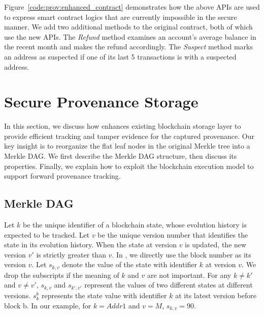 Figure~\ref{code:prov:enhanced_contract} demonstrates how the above APIs are used to express smart contract logics
that are currently impossible in the secure manner.
We add two additional methods to the original contract, both of which use the new
APIs. The \textit{Refund} method examines an account's average balance in the recent month and makes the
refund accordingly. The \textit{Suspect} method marks an address as suspected if one of its last 5
transactions is with a suspected address. 



\section{Secure Provenance Storage} 
\label{prov:sec:storage}
In this section, we discuss how {\fs} enhances existing blockchain storage layer to provide efficient
tracking and tamper evidence for the captured provenance. Our key insight is to reorganize the flat leaf
nodes in the original Merkle tree into a Merkle DAG. We first describe the Merkle DAG structure, then discuss
its properties. Finally, we explain how to exploit the blockchain execution model to support forward
provenance tracking. 

\subsection{Merkle DAG}

Let $k$ be the unique identifier of a blockchain state, whose evolution history is expected to be tracked. 
Let $v$ be the unique version number that identifies the state in its evolution history. 
When the state at version $v$ is updated, the new version $v'$ is strictly greater than $v$. 
In {\fs}, we directly use the block number as its version $v$. 
Let $s_{k,v}$ denote the value of the state with identifier
$k$ at version $v$. We drop the subscripts if the meaning of $k$ and $v$ are not important. For any $k \neq
k'$ and $v \neq v'$, $s_{k,v}$ and $s_{k',v'}$ represent the values of two different states at different versions.  
$s^b_k$ represents the state value with identifier $k$ at its latest version before block b. 
In our example, for $k=Addr1$ and $v=M$, $s_{k,v}=90$.

